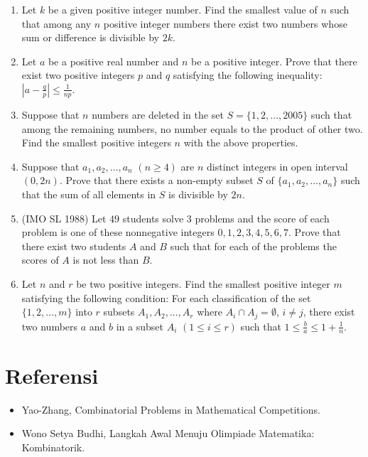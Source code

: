 \documentclass[11pt]{scrartcl}
\begin{document}
\begin{enumerate}
    \item Let $k$ be a given positive integer number. Find the smallest value of $n$ such that among any $n$ positive integer numbers there exist two numbers whose sum or difference is divisible by $2k$.
    
    \item Let $a$ be a positive real number and $n$ be a positive integer. Prove that there exist two positive integers $p$ and $q$ satisfying the following inequality: $\left|a-\frac{q}{p}\right| \le \frac{1}{np}$.
    
    \item Suppose that $n$ numbers are deleted in the set $S = \{1 ,2, \dots , 2005 \}$ such that among the remaining numbers, no number equals to the product of other two. Find the smallest positive integers $n$ with the above properties.
    
    \item Suppose that $a_1, a_2, \dots, a_n$ $(n \ge 4)$ are $n$ distinct integers in open interval $(0, 2n)$. Prove that there exists a non-empty subset $S$ of $\{a_1, a_2, \dots, a_n\}$ such that the sum of all elements in $S$ is divisible by $2n$.
    
    \item (IMO SL 1988) Let $49$ students solve $3$ problems and the score of each problem is one of these nonnegative integers $0, 1, 2, 3, 4, 5, 6, 7$. Prove that there exist two students $A$ and $B$ such that for each of the problems the scores of $A$ is not less than $B$.
    
    \item Let $n$ and $r$ be two positive integers. Find the smallest positive integer $m$ satisfying the following condition: For each classification of the set $\{1, 2, \dots, m \}$ into $r$ subsets $A_1, A_2, \dots, A_r$ where $A_i \cap A_j = \emptyset$, $i \neq j$, there exist two numbers $a$ and $b$ in a subset $A_i$ $(1 \le i \le r)$ such that $1 \le \frac{b}{a} \le 1 + \frac{1}{n}$.
\end{enumerate}

\section{Referensi}
\begin{itemize}
    \item Yao-Zhang, Combinatorial Problems in Mathematical Competitions.
    \item Wono Setya Budhi, Langkah Awal Menuju Olimpiade Matematika: Kombinatorik.
\end{itemize}
\end{document}
